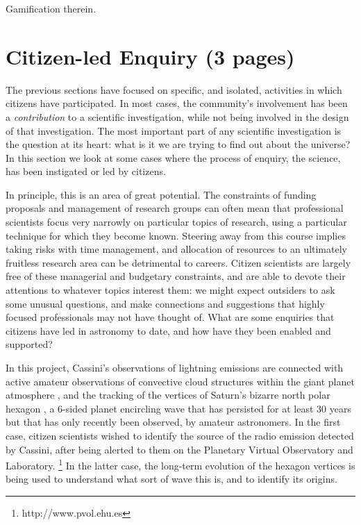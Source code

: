 \documentclass{ar2e}
\begin{document}
Gamification therein.




\section{Citizen-led Enquiry (3 pages)}
\label{sec:explore}

The previous sections have focused on specific, and isolated, activities in
which citizens have participated. In most cases, the community's involvement has
been a {\it contribution} to a scientific investigation, while not being
involved in the design of that investigation. The most important part of any
scientific investigation is the question at its heart: what is it we are trying
to find out about the universe? In this section we look at some cases where the
process of enquiry, the science, has been instigated or led by citizens.  

In principle, this is an area of great potential. The constraints of funding
proposals and management of research groups can often mean that professional
scientists focus very narrowly on particular topics of research, using a
particular technique for which they become known.  Steering away from this
course implies taking risks with time management, and allocation of resources to
an ultimately fruitless research area can be detrimental to careers.  Citizen
scientists are largely free of these managerial and budgetary constraints, and
are able to devote their attentions to whatever topics interest them: we might
expect outsiders to ask some unusual questions, and make connections and
suggestions that highly focused professionals may not have thought of. What are
some enquiries that citizens have led in astronomy to date, and how have they
been enabled and supported?


  In this project, Cassini's observations of
lightning emissions are connected with active amateur observations of
convective cloud structures within the giant planet atmosphere
\citep{Fischer++2011},  and the tracking of the vertices of Saturn's bizarre
north polar hexagon \citep{godfrey88}, a 6-sided planet encircling wave that
has persisted for at least 30 years but that has only recently been observed,
by amateur astronomers.  In the first case, citizen scientists wished to
identify the source of the radio emission detected by Cassini, after being
alerted to them on the Planetary Virtual  Observatory and Laboratory.
\footnote{http://www.pvol.ehu.es} In the latter case, the long-term evolution
of the hexagon vertices is being used to understand what sort of wave this is,
and to identify its origins.
\end{document}
